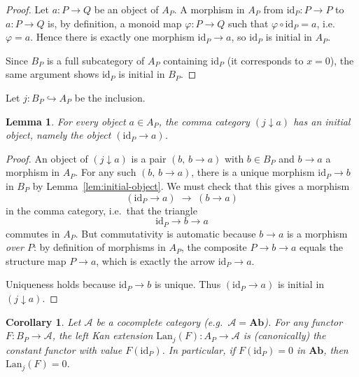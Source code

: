 \documentclass[11pt]{article}
\newtheorem{lemma}[theorem]{Lemma}
\newtheorem{corollary}[theorem]{Corollary}
\theoremstyle{remark}
\begin{document}
\begin{proof}
Let $a\colon P\to Q$ be an object of $A_P$. A morphism in $A_P$ from $\mathrm{id}_P\colon P\to P$
to $a\colon P\to Q$ is, by definition, a monoid map $\varphi\colon P\to Q$ such that
$\varphi\circ \mathrm{id}_P = a$, i.e.\ $\varphi=a$. Hence there is exactly one morphism
$\mathrm{id}_P\to a$, so $\mathrm{id}_P$ is initial in $A_P$.

Since $B_P$ is a full subcategory of $A_P$ containing $\mathrm{id}_P$ (it corresponds to $x=0$),
the same argument shows $\mathrm{id}_P$ is initial in $B_P$.
\end{proof}

Let $j\colon B_P\hookrightarrow A_P$ be the inclusion.

\begin{lemma}\label{lem:comma-initial}
For every object $a\in A_P$, the comma category $(j\downarrow a)$ has an initial object,
namely the object $(\mathrm{id}_P \xrightarrow{} a)$.
\end{lemma}

\begin{proof}
An object of $(j\downarrow a)$ is a pair $(b,\,b\to a)$ with $b\in B_P$ and $b\to a$ a morphism in $A_P$.
For any such $(b,\,b\to a)$, there is a unique morphism $\mathrm{id}_P\to b$ in $B_P$ by
Lemma~\ref{lem:initial-object}. We must check that this gives a morphism
\[
(\mathrm{id}_P\to a)\;\longrightarrow\;(b\to a)
\]
in the comma category, i.e.\ that the triangle
\[
\mathrm{id}_P \longrightarrow b \longrightarrow a
\]
commutes in $A_P$. But commutativity is automatic because $b\to a$ is a morphism \emph{over $P$}:
by definition of morphisms in $A_P$, the composite $P\to b \to a$ equals the structure map $P\to a$,
which is exactly the arrow $\mathrm{id}_P\to a$.

Uniqueness holds because $\mathrm{id}_P\to b$ is unique.
Thus $(\mathrm{id}_P\to a)$ is initial in $(j\downarrow a)$.
\end{proof}

\begin{corollary}\label{cor:Lan-constant}
Let $\mathcal{A}$ be a cocomplete category (e.g.\ $\mathcal{A}=\mathbf{Ab}$).
For any functor $F\colon B_P\to \mathcal{A}$, the left Kan extension
$\mathrm{Lan}_j(F)\colon A_P\to \mathcal{A}$ is (canonically) the constant functor with value $F(\mathrm{id}_P)$.
In particular, if $F(\mathrm{id}_P)=0$ in $\mathbf{Ab}$, then $\mathrm{Lan}_j(F)=0$.
\end{corollary}
\end{document}
